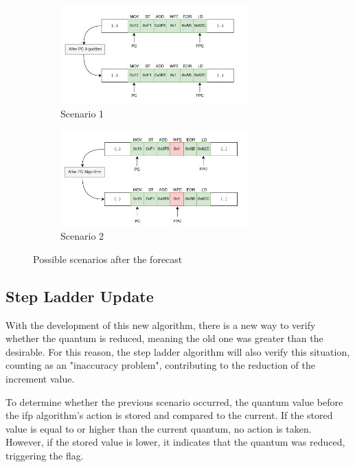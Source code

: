 \begin{figure} [H]
\centering
\begin{subfigure}{\textwidth}
    \includegraphics[width=0.8\textwidth]{Images/PCAlgrithm_noCut.png}
    \caption{ Scenario 1 }
    \label{fig:PCAlgrithm_noCut}
\end{subfigure}
\begin{subfigure}{\textwidth}
    \includegraphics[width=0.8\textwidth]{Images/PCAlgrithm_Cut.png}
    \caption{ Scenario 2 }
    \label{fig:PCAlgrithm_Cut}
\end{subfigure}
        
\caption{Possible scenarios after the forecast}
\label{fig:PCAlgorithm_differentScenarios}
\end{figure}

\subsection{Step Ladder Update}

With the development of this new algorithm, there is a new way to verify whether the quantum is reduced, meaning the old one was greater 
than the desirable. For this reason, the step ladder algorithm will also verify this situation, counting as an "inaccuracy problem", contributing 
to the reduction of the increment value.

To determine whether the previous scenario occurred, the quantum value before the \gls{ifp} algorithm's action is stored and compared to the current. 
If the stored value is equal to or higher than the current quantum, no action is taken. However, if the stored value is lower, it indicates that 
the quantum was reduced, triggering the flag. 


